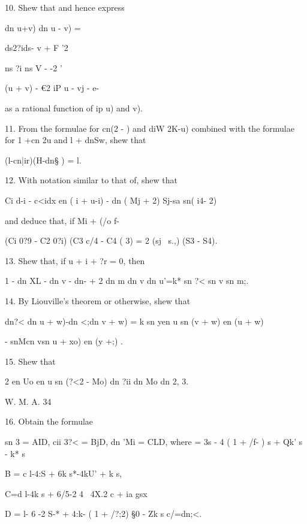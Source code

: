 
10. Shew that and hence express

dn u+v) dn u - v) =

ds2?ids- v + F '2

ns ?i ns V - -2 '

(u + v) - €2 iP u - vj - e-

as a rational function of ip u) and v). 

11. From the formulae for cn(2 - ) and diW 2K-u) combined with the
formulae for 1 +cn 2u and l + dnSw, shew that

(l-cn|ir)(H-dn§ ) = l. 

12. With notation similar to that of, shew that

Ci d-i - c<idx en ( i + u-i) - dn ( Mj + 2) Sj-sa sn( i4- 2)

and deduce that, if Mi + (/o f-%

(Ci 0?9 - C2 0?i) (C3 c/4 - C4 ( 3) = 2 (sj \ s.,) (S3 - S4).


13. Shew that, if u + i + ?r = 0, then

1 - dn XL - dn v - dn-  + 2 dn m dn v dn u'=k* sn ?< sn v sn m;.


14. By Liouville's theorem or otherwise, shew that

dn?< dn u + w)-dn <;dn v + w) = k sn yen u sn (v + w) en (u + w)

- snMcn vsn u + xo) en (y +;) .


15. Shew that

2 en Uo en u sn (?<2 - %
Mo) dn ?ii dn Mo dn %
2, 3. 

W. M. A. 34

%
%

16. Obtain the formulae

sn 3 = AID, cii 3?< = BjD, dn 'Mi = CLD, where = 3s - 4 ( 1 + /f- ) s
+ Qk' s - k* s%

B = c l-4:S + 6k s*-4kU' + k s,

C=d l-4k s + 6/5-2 4 \ 4X.2 c + ia gsx

D = l- 6 -2 S-* + 4:k- ( 1 + /?;2) §0 - Zk s%
c/=dn;<.

